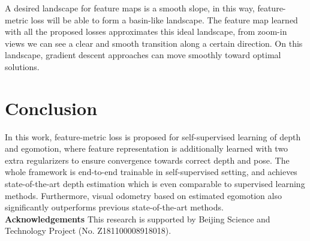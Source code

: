 \documentclass[runningheads]{llncs}
\begin{document}
A desired landscape for feature maps is a smooth slope, in this way, feature-metric loss will be able to form a basin-like landscape.
The feature map learned with all the proposed losses approximates this ideal landscape, from zoom-in views we can see a clear and smooth transition along a certain direction.
On this landscape, gradient descent approaches can move smoothly toward optimal solutions. \section{Conclusion}
\label{con}
In this work, feature-metric loss is proposed for self-supervised learning of depth and egomotion, where feature representation is additionally learned with two extra regularizers to ensure convergence towards correct depth and pose. The whole framework is end-to-end trainable in self-supervised setting, and achieves state-of-the-art depth estimation which is even comparable to supervised learning methods. Furthermore, visual odometry based on estimated egomotion also significantly outperforms previous state-of-the-art methods.
\\
\noindent
\textbf{Acknowledgements} This research is supported by Beijing Science and Technology Project (No. Z181100008918018).


 
\clearpage


\end{document}
